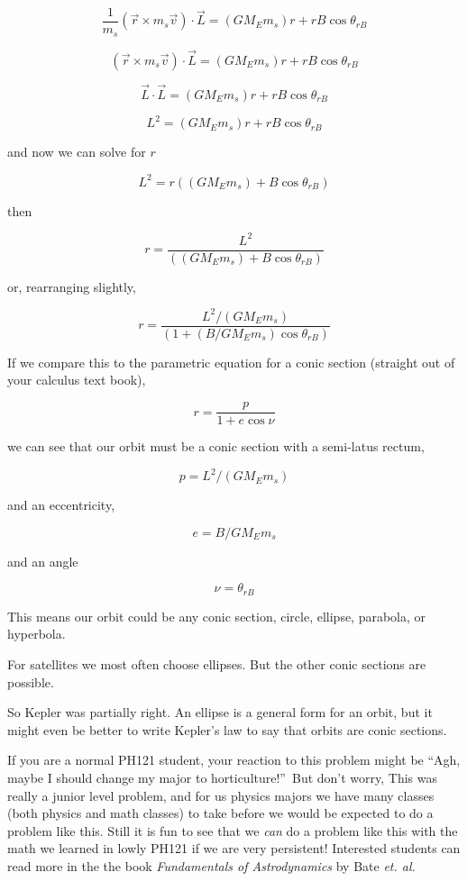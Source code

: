 $$\frac{1}{m_{s}}\left( \overrightarrow{r}\times m_{s}\overrightarrow{v}\right) \cdot \overrightarrow{L}=\left( GM_{E}m_{s}\right) r+rB\cos \theta_{rB}
$$

$$\left( \overrightarrow{r}\times m_{s}\overrightarrow{v}\right) \cdot \overrightarrow{L}=\left( GM_{E}m_{s}\right) r+rB\cos \theta _{rB} 
$$

$$\overrightarrow{L}\cdot \overrightarrow{L}=\left( GM_{E}m_{s}\right)r+rB\cos \theta _{rB} 
$$

$$L^{2}=\left( GM_{E}m_{s}\right) r+rB\cos \theta _{rB} 
$$

and now we can solve for $r$%

$$L^{2}=r\left( \left( GM_{E}m_{s}\right) +B\cos \theta _{rB}\right) 
$$

then 

$$r=\frac{L^{2}}{\left( \left( GM_{E}m_{s}\right) +B\cos \theta _{rB}\right) } 
$$

or, rearranging slightly, 

$$r=\frac{L^{2}/\left( GM_{E}m_{s}\right) }{\left( 1+\left(B/GM_{E}m_{s}\right) \cos \theta _{rB}\right) } $$

If we compare this to the parametric equation for a conic section (straight out of your calculus text book), 

$$r=\frac{p}{1+e\cos \nu } $$

we can see that our orbit must be a conic section with a semi-latus rectum, 

$$p=L^{2}/\left( GM_{E}m_{s}\right) $$

and an eccentricity, 
 
$$e=B/GM_{E}m_{s}$$

and an angle 

$$\nu =\theta _{rB}$$

This means our orbit could be any conic section, circle, ellipse, parabola, or hyperbola.

For satellites we most often choose ellipses. But the other conic sections are possible.

So Kepler was partially right. An ellipse is a general form for an orbit, but it might even be better to write Kepler's law to say that orbits are conic sections.


If you are a normal PH121 student, your reaction to this problem might be \textquotedblleft Agh, maybe I should change my major to
horticulture!\textquotedblright\ But don't worry, This was really a junior level problem, and for us physics majors we have many classes (both physics and math classes) to take before we would be expected to do a problem like this. Still it is fun to see that we \emph{can} do a problem like this with the math we learned in lowly PH121 if we are very persistent!  Interested students can read more in the the book \textit{Fundamentals of Astrodynamics} by Bate \textit{et. al.} \cite{Bate1971}
	
